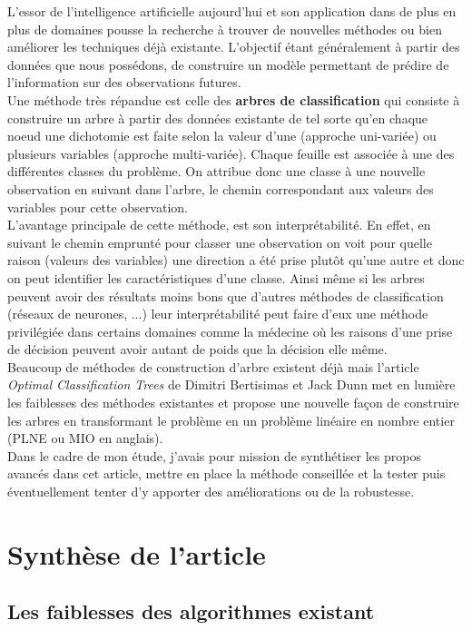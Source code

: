 \documentclass[12pt]{report}
\begin{document}
L'essor de l'intelligence artificielle aujourd'hui et son application dans de plus en plus de domaines pousse la recherche à trouver de nouvelles méthodes ou bien améliorer les techniques déjà existante. L'objectif étant généralement à partir des données que nous possédons, de construire un modèle permettant de prédire de l'information sur des observations futures.\\
Une méthode très répandue est celle des \textbf{arbres de classification} qui consiste à construire un arbre à partir des données existante de tel sorte qu'en chaque noeud une dichotomie est faite selon la valeur d'une (approche uni-variée) ou plusieurs variables (approche multi-variée). Chaque feuille est associée à une des différentes classes du problème. On attribue donc une classe à une nouvelle observation en suivant dans l'arbre, le chemin correspondant aux valeurs des variables pour cette observation.\\
L'avantage principale de cette méthode, est son interprétabilité. En effet, en suivant le chemin emprunté pour classer une observation on voit pour quelle raison (valeurs des variables) une direction a été prise plutôt qu'une autre et donc on peut identifier les caractéristiques d'une classe. Ainsi même si les arbres peuvent avoir des résultats moins bons que d'autres méthodes de classification (réseaux de neurones, ...) leur interprétabilité peut faire d'eux une méthode privilégiée dans certains domaines comme la médecine où les raisons d'une prise de décision peuvent avoir autant de poids que la décision elle même.\\
Beaucoup de méthodes de construction d'arbre existent déjà mais l'article \textit{Optimal Classification Trees} de Dimitri Bertisimas et Jack Dunn met en lumière les faiblesses des méthodes existantes et propose une nouvelle façon de construire les arbres en transformant le problème en un problème linéaire en nombre entier (PLNE ou MIO en anglais).\\
Dans le cadre de mon étude, j'avais pour mission de synthétiser les propos avancés dans cet article, mettre en place la méthode conseillée et la tester puis éventuellement tenter d'y apporter des améliorations ou de la robustesse. 

\chapter{Synthèse de l'article}

\section{Les faiblesses des algorithmes existant}
\end{document}
